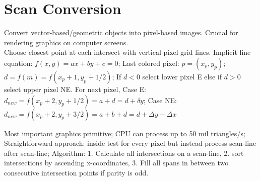 \section{Scan Conversion}
 Convert vector-based/geometric objects into pixel-based images. Crucial for rendering graphics on computer screens. \\ 
Choose closest point at each intersect with vertical pixel grid lines. Implicit line equation: $f(x,y) = ax + by + c = 0$; Last colored pixel: $p = (x_p, y_p)$; $d = f(m) = f(x_p + 1, y_p + 1/2)$;
If $d < 0$ select lower pixel E else if $d > 0$ select upper pixel NE. For next pixel, Case E: $d_{new} = f(x_p + 2, y_p + 1/2) = a + d = d + \delta{y}$; Case NE: $d_{new} = f(x_p + 2, y_p + 3/2) = a + b + d = d + \Delta{y} - \Delta{x}$

 Most important graphics primitive; CPU can process up to 50 mil triangles/s; Straightforward approach: inside test for every pixel but instead process scan-line after scan-line; Algorithm: 1. Calculate all intersections on a scan-line, 2. sort intersections by ascending x-coordinates, 3. Fill all spans in between two consecutive intersection points if parity is odd.
